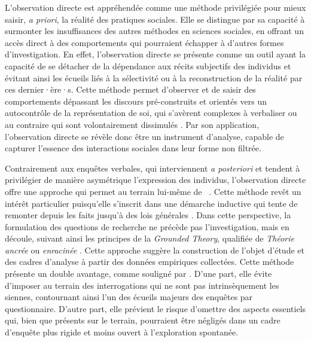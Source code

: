 \begin{refsegment}
L'observation directe est appréhendée comme une méthode privilégiée pour mieux saisir, \textsl{a priori}, la réalité des pratiques sociales. Elle se distingue par sa capacité à surmonter les insuffisances des autres méthodes en sciences sociales, en offrant un accès direct à des comportements qui pourraient échapper à d'autres formes d'investigation. En effet, l'observation directe se présente comme un outil ayant la capacité de se détacher de la dépendance aux récits subjectifs des individus et évitant ainsi les écueils liés à la sélectivité ou à la reconstruction de la réalité par ces dernier·ère·s. Cette méthode permet d'observer et de saisir des comportements dépassant les discours pré-construits et orientés vers un autocontrôle de la représentation de soi, qui s'avèrent complexes à verbaliser ou au contraire qui sont volontairement dissimulés \textcolor{blue}{\autocite[26]{arborio_observation_2007}}. Par son application, l'observation directe se révèle donc être un instrument d'analyse, capable de capturer l'essence des interactions sociales dans leur forme non filtrée.%

Contrairement aux enquêtes verbales, qui interviennent \textsl{a posteriori} et tendent à privilégier de manière asymétrique l'expression des individus, l'observation directe offre une approche qui permet au terrain lui-même de ~\textcolor{blue}{\autocite[101]{cochoy_mort_2013}}. Cette méthode revêt un intérêt particulier puisqu'elle s'inscrit dans une démarche inductive qui tente de remonter depuis les faits jusqu'à des lois générales \textcolor{blue}{\autocite[28]{arborio_observation_2007}}. Dans cette perspective, la formulation des questions de recherche ne précède pas l'investigation, mais en découle, suivant ainsi les principes de la \textsl{Grounded Theory}, qualifiée de \textsl{Théorie ancrée} ou \textsl{enracinée} \textcolor{blue}{\autocite[144]{joannides_grounded_2008}}. Cette approche suggère la construction de l'objet d'étude et des cadres d'analyse à partir des données empiriques collectées. Cette méthode présente un double avantage, comme souligné par \textcolor{blue}{\textcite[101]{cochoy_mort_2013}}. D'une part, elle évite d'imposer au terrain des interrogations qui ne sont pas intrinsèquement les siennes, contournant ainsi l'un des écueils majeurs des enquêtes par questionnaire. D'autre part, elle prévient le risque d'omettre des aspects essentiels qui, bien que présents sur le terrain, pourraient être négligés dans un cadre d'enquête plus rigide et moins ouvert à l'exploration spontanée.%


\end{refsegment}

